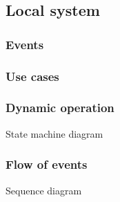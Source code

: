 %
\subsection{Local system}
\label{sec:local-system}

\subsubsection{Events}
\label{sec:events}

\subsubsection{Use cases}
\label{sec:use-cases}

\subsubsection{Dynamic operation}
\label{sec:dyn-oper}
State machine diagram

\subsubsection{Flow of events}
\label{sec:flow-events}
Sequence diagram

